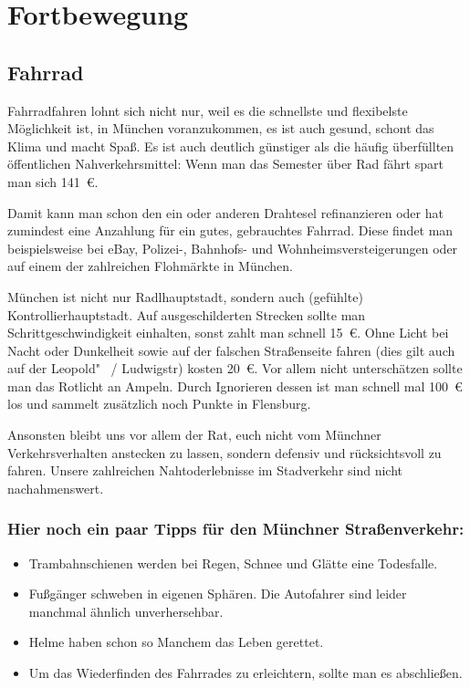 ﻿
\chapter{Fortbewegung}

\section{Fahrrad}

Fahrradfahren lohnt sich nicht nur, weil es die schnellste und
flexibelste Möglichkeit ist, in München voranzukommen, es ist auch
gesund, schont das Klima und macht Spaß.  Es ist auch deutlich
günstiger als die häufig überfüllten öffentlichen Nahverkehrsmittel:
Wenn man das Semester über Rad fährt spart man sich 141~€.

Damit kann man schon den ein oder anderen Drahtesel refinanzieren oder
hat zumindest eine Anzahlung für ein gutes, gebrauchtes Fahrrad. Diese
findet man beispielsweise bei eBay, Polizei-, Bahnhofs- und
Wohnheimsversteigerungen oder auf einem der zahlreichen Flohmärkte in
München. 

München ist nicht nur Radlhauptstadt, sondern auch (gefühlte)
Kontrollierhauptstadt. Auf ausgeschilderten Strecken sollte man Schrittgeschwindigkeit
einhalten, sonst zahlt man schnell 15~€. Ohne Licht bei Nacht oder
Dunkelheit sowie auf der falschen Straßenseite fahren
(dies gilt auch auf der Leopold"~ / Ludwigstr) kosten 20~€.  Vor allem nicht unterschätzen sollte man das Rotlicht
an Ampeln. Durch Ignorieren dessen ist man schnell mal 100~€ los und sammelt
zusätzlich noch Punkte in Flensburg.

Ansonsten bleibt uns vor allem der Rat, euch nicht vom Münchner
Verkehrsverhalten anstecken zu lassen, sondern defensiv und rücksichtsvoll zu
fahren. Unsere zahlreichen Nahtoderlebnisse im Stadverkehr sind nicht
nachahmenswert.

\subsection*{Hier noch ein paar Tipps für den Münchner Straßenverkehr:}
\begin{itemize}
	\item Trambahnschienen werden bei Regen, Schnee und Glätte eine Todesfalle.
	\item Fußgänger schweben in eigenen Sphären. Die Autofahrer sind leider 
				manchmal ähnlich unverhersehbar.
	\item Helme haben schon so Manchem das Leben gerettet.
	\item Um das Wiederfinden des Fahrrades zu erleichtern, sollte man es 
				abschließen.
\end{itemize}

